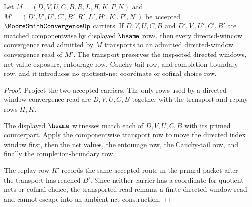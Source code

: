 \begin{theorem}
\label{thm:moore-smith-convergence-directed-window-stability}
Let $M=(D,V,U,C,B,R,L,H,K,P,N)$ and $M'=(D',V',U',C',B',R',L',H',K',P',N')$ be accepted $\MooreSmithConvergenceUp$ carriers. If $D,V,U,C,B$ and $D',V',U',C',B'$ are matched componentwise by displayed $\hsame$ rows, then every directed-window convergence read admitted by $M$ transports to an admitted directed-window convergence read of $M'$. The transport preserves the inspected directed windows, net-value exposure, entourage row, Cauchy-tail row, and completion-boundary row, and it introduces no quotient-net coordinate or cofinal choice row.
\end{theorem}
\begin{proof}
Project the two accepted carriers. The only rows used by a directed-window convergence read are $D,V,U,C,B$ together with the transport and replay rows $H,K$.

The displayed $\hsame$ witnesses match each of $D,V,U,C,B$ with its primed counterpart. Apply the componentwise transport row to move the directed index window first, then the net values, the entourage row, the Cauchy-tail row, and finally the completion-boundary row.

The replay row $K'$ records the same accepted route in the primed packet after the transport has reached $B'$. Since neither carrier has a coordinate for quotient nets or cofinal choice, the transported read remains a finite directed-window read and cannot escape into an ambient net construction.
\end{proof}

